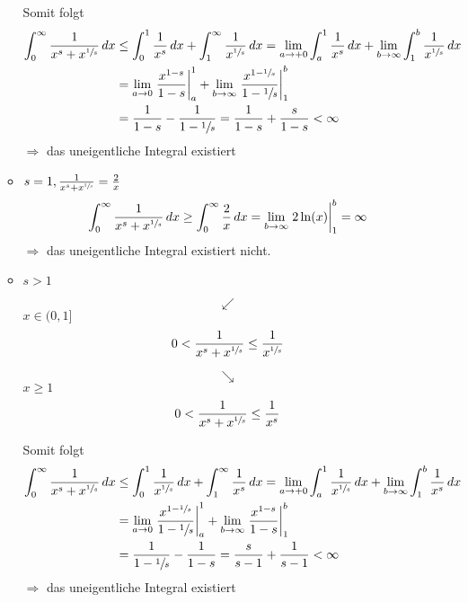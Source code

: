 \documentclass{article}
\begin{document}
\begin{enumerate}[1.]
\begin{itemize}
    Somit folgt
    \begin{align*}
      \int_0^{\infty} \frac{1}{x^s + x^{\sfrac{1}{s}}}\,dx
        &\leq \int_0^1 \frac{1}{x^s}\,dx + \int_1^{\infty} \frac{1}{x^{\sfrac{1}{s}}} \,dx
          = \lim_{a \to +0} \int_a^1 \frac{1}{x^s}\,dx + \lim_{b \to \infty} \int_1^b \frac{1}{x^{\sfrac{1}{s}}}\,dx \\
        &= \lim_{a \to 0} \eval{\frac{x^{1 - s}}{1 - s}}_a^1 +
          \lim_{b \to \infty} \eval{\frac{x^{1 - \sfrac{1}{s}}}{1 - \sfrac{1}{s}}}_1^b \\
        &= \frac{1}{1 - s} - \frac{1}{1 - \sfrac{1}{s}} = \frac{1}{1 - s} + \frac{s}{1 - s} < \infty
    \end{align*}
    $\Rightarrow$ das uneigentliche Integral existiert
  \item $s = 1, \frac{1}{x^s + x^{\sfrac{1}{s}}} = \frac{2}{x}$
    \[
      \int_0^{\infty} \frac{1}{x^s + x^{\sfrac{1}{s}}}\,dx \geq \int_0^{\infty} \frac{2}{x}\,dx =
      \lim_{b \to \infty} \eval{2 \ln(x)}_1^b = \infty
    \]
    $\Rightarrow$ das uneigentliche Integral existiert nicht.

  \item $s > 1$

    \begin{minipage}[t]{.4\textwidth}
      \[ \swarrow \]
      $x \in (0, 1]$
      \[
        0 < \frac{1}{x^s + x^{\sfrac{1}{s}}} \leq \frac{1}{x^{\sfrac{1}{s}}}
      \]
    \end{minipage}
    \hfill
    \begin{minipage}[t]{.4\textwidth}
      \[ \searrow \]
      $x \geq 1$
      \[
        0 < \frac{1}{x^s + x^{\sfrac{1}{s}}} \leq \frac{1}{x^s}
      \]
    \end{minipage}
    
    Somit folgt
    \begin{align*}
      \int_0^{\infty} \frac{1}{x^s + x^{\sfrac{1}{s}}}\,dx
        &\leq \int_0^1 \frac{1}{x^{\sfrac{1}{s}}}\,dx + \int_1^{\infty} \frac{1}{x^s} \,dx
          = \lim_{a \to +0} \int_a^1 \frac{1}{x^{\sfrac{1}{s}}}\,dx + \lim_{b \to \infty} \int_1^b \frac{1}{x^s}\,dx \\
        &= \lim_{a \to 0} \eval{\frac{x^{1 - \sfrac{1}{s}}}{1 - \sfrac{1}{s}}}_a^1 +
          \lim_{b \to \infty} \eval{\frac{x^{1 - s}}{1 - s}}_1^b \\
        &= \frac{1}{1 - \sfrac{1}{s}} - \frac{1}{1 - s} = \frac{s}{s - 1} + \frac{1}{s - 1} < \infty
    \end{align*}
    $\Rightarrow$ das uneigentliche Integral existiert
  \end{itemize}
\end{enumerate}
\end{document}
